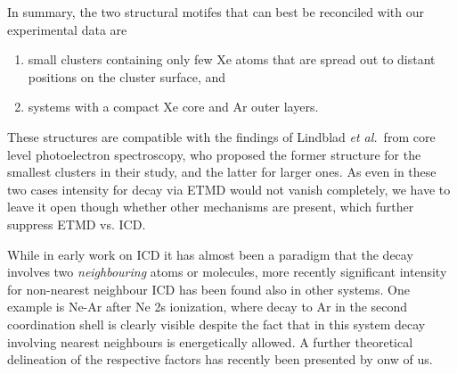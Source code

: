 In summary, the two structural motifes that can best be reconciled with our experimental data are
\begin{enumerate}
	\item small clusters containing only few Xe atoms that are spread out to distant positions on the cluster surface, and
	\item systems with a compact Xe core and Ar outer layers.
\end{enumerate}
These structures are compatible with the findings of Lindblad {\it et al.}\ from core level photoelectron spectroscopy, who proposed the former structure for the smallest clusters in their study, and the latter for larger ones.\cite{lindblad}
As even in these two cases intensity for decay via ETMD would not vanish completely, we have to leave it open though whether other mechanisms are present, which further suppress ETMD vs. ICD.

While in early work on ICD it has almost been a paradigm that the decay involves two {\it neighbouring} atoms or molecules,\cite{hergenhahn_review} more recently significant intensity for non-nearest neighbour ICD has been found also in other systems.
One example is Ne-Ar after Ne 2s ionization, where decay to Ar in the second coordination shell is clearly visible despite the fact that in this system decay involving nearest neighbours is energetically allowed.\cite{fasshauer2014}
A further theoretical delineation of the respective factors has recently been presented by onw of us.\cite{fasshauernjp}